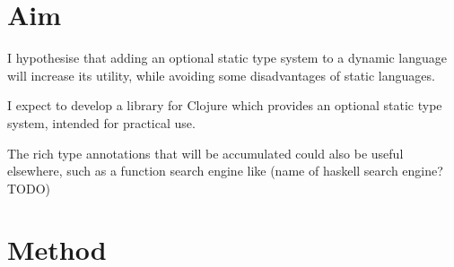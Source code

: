 \documentclass[12pt, a4paper]{article}
\begin{document}
\section*{Aim} 


I hypothesise that adding an optional static type system to a dynamic language
will increase its utility, while avoiding some disadvantages of static
languages.

I expect to develop a library for Clojure which provides an optional static
type system, intended for practical use. 

The rich type annotations that will be accumulated could also be
useful elsewhere, such as a function search engine like
(name of haskell search engine? TODO)

\section*{Method}

\end{document}
